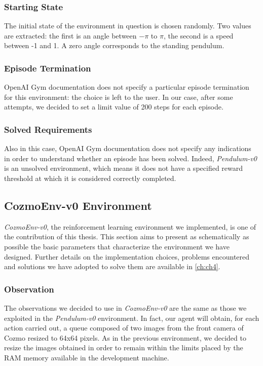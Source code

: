 \subsubsection{Starting State}

The initial state of the environment in question is chosen randomly.
Two values are extracted: the first is an angle between  $-\pi$ to $\pi$, the second is a speed between -1 and 1.
A zero angle corresponds to the standing pendulum.

\subsubsection{Episode Termination}

OpenAI Gym documentation does not specify a particular episode termination for this environment: the choice is left to the user.
In our case, after some attempts, we decided to set a limit value of 200 steps for each episode.

\subsubsection{Solved Requirements}

Also in this case, OpenAI Gym documentation does not specify any indications in order to understand whether an episode has been solved.
Indeed, \textit{Pendulum-v0} is an unsolved environment, which means it does not have a specified reward threshold at which it is considered correctly completed.

\subsection{CozmoEnv-v0 Environment}

\textit{CozmoEnv-v0}, the reinforcement learning environment we implemented, is one of the contribution of this thesis.
This section aims to present as schematically as possible the basic parameters that characterize the environment we have designed.
Further details on the implementation choices, problems encountered and solutions we have adopted to solve them are available in \vref{ch:ch4}.

\subsubsection{Observation}

The observations we decided to use in \textit{CozmoEnv-v0} are the same as those we exploited in the \textit{Pendulum-v0} environment.
In fact, our agent will obtain, for each action carried out, a queue composed of two images from the front camera of Cozmo resized to 64x64 pixels.
As in the previous environment, we decided to resize the images obtained in order to remain within the limits placed by the RAM memory available in the development machine.

